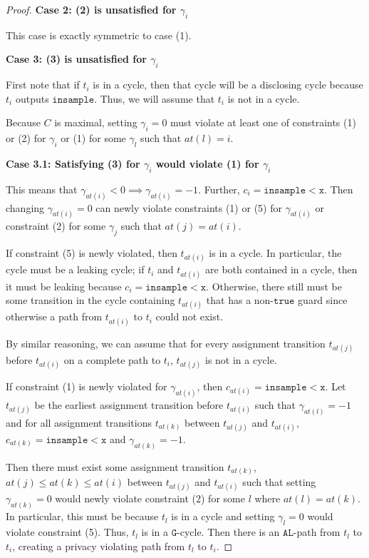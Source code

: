 \documentclass[12pt]{article}
\newcommand{\lguard}[1][x]{\texttt{insample} < #1}
\theoremstyle{definition}
\begin{document}
\begin{proof}
    \textbf{Case 2: (2) is unsatisfied for $\gamma_i$}

    This case is exactly symmetric to case (1).

    \textbf{Case 3: (3) is unsatisfied for $\gamma_i$}

    First note that if $t_i$ is in a cycle, then that cycle will be a disclosing cycle because $t_i$ outputs $\texttt{insample}$. Thus, we will assume that $t_i$ is not in a cycle.

    Because $C$ is maximal, setting $\gamma_i=0$ must violate at least one of constraints (1) or (2) for $\gamma_i$ or (1) for some $\gamma_l$ such that $at(l) = i$.

    \textbf{Case 3.1: Satisfying (3) for $\gamma_i$ would violate (1) for $\gamma_i$}

    This means that $\gamma_{at(i)}<0\implies \gamma_{at(i)} = -1$. Further, $c_i = \lguard[\texttt{x}]$. Then changing $\gamma_{at(i)}=0$ can newly violate constraints (1) or (5) for $\gamma_{at(i)}$ or constraint (2) for some $\gamma_j$ such that $at(j) = at(i)$.

    If constraint (5) is newly violated, then $t_{at(i)}$ is in a cycle. In particular, the cycle must be a leaking cycle; if $t_i$ and $t_{at(i)}$ are both contained in a cycle, then it must be leaking because $c_i = \lguard[\texttt{x}]$. Otherwise, there still must be some transition in the cycle containing $t_{at(i)}$ that has a non-$\texttt{true}$ guard since otherwise a path from $t_{at(i)}$ to $t_i$ could not exist. 

    By similar reasoning, we can assume that for every assignment transition $t_{at(j)}$before $t_{at(i)}$ on a complete path to $t_i$, $t_{at(j)}$ is not in a cycle. 

    If constraint (1) is newly violated for $\gamma_{at(i)}$, then $c_{at(i)} = \lguard[\texttt{x}]$. Let $t_{at(j)}$ be the earliest assignment transition before $t_{at(i)}$ such that $\gamma_{at(l)} = -1$ and for all assignment transitions $t_{at(k)}$ between $t_{at(j)}$ and $t_{at(i)}$, $c_{at(k)} = \lguard[\texttt{x}]$ and $\gamma_{at(k)} = -1$. 
    
    Then there must exist some assignment transition $t_{at(k)}$, $at(j)\leq at(k)\leq at(i)$ between $t_{at(j)}$ and $t_{at(i)}$ such that setting $\gamma_{at(k)} = 0$ would newly violate constraint (2) for some $l$ where $at(l) = at(k)$. In particular, this must be because $t_l$ is in a cycle and setting $\gamma_l = 0$ would violate constraint (5). Thus, $t_l$ is in a $\texttt{G}$-cycle. Then there is an $\texttt{AL}$-path from $t_l$ to $t_i$, creating a privacy violating path from $t_l$ to $t_i$. 


\end{proof}
\end{document}
